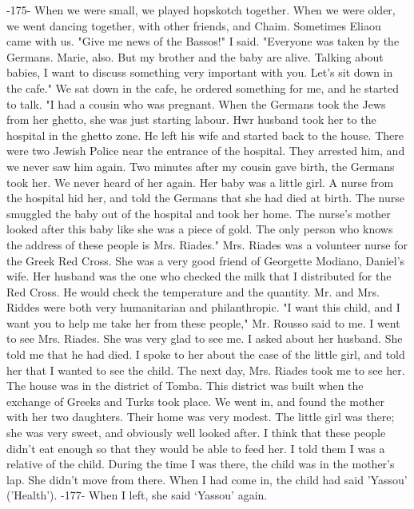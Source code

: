 
-175- 
When we were small, we played hopskotch together.
When we were older, 
we went dancing together, with other friends, and Chaim.
Sometimes 
Eliaou came with us.
"Give me news of the Bassos!"
I said.
"Everyone was taken by the Germans.
Marie, also.
But my brother 
and the baby are alive.
Talking about babies, I want to discuss something very important with you.
Let's sit down in the cafe."
We sat down in the cafe, he ordered something for me, and he started to 
talk.
"I had a cousin who was pregnant.
When the Germans took the 
Jews from her ghetto, she was just starting labour.
Hwr husband took 
her to the hospital in the ghetto zone.
He left his wife and started 
back to the house.
There were two Jewish Police near the entrance of 
the hospital.
They arrested him, and we never saw him again.
Two minutes after my cousin gave birth, the Germans took her.
We never heard 
of her again.
Her baby was a little girl.
A nurse from the hospital 
hid her, and told the Germans that she had died at birth.
The nurse 
smuggled the baby out of the hospital and took her home.
The nurse's 
mother looked after this baby like she was a piece of gold.
The only 
person who knows the address of these people is Mrs.
Riades."
Mrs.
Riades was a volunteer nurse for the Greek Red Cross.
She was 
a very good friend of Georgette Modiano, Daniel's wife.
Her husband was 
the one who checked the milk that I distributed for the Red Cross.
He 
would check the temperature and the quantity.
Mr.
and Mrs.
Riddes were 
both very humanitarian and philanthropic.
"I want this child, and I want you to help me take her from these 
people," Mr.
Rousso said to me.
I went to see Mrs.
Riades.
She was very glad to see me.
I asked 
about her husband.
She told me that he had died.
I spoke to her about 
the case of the little girl, and told her that I wanted to see the 
child.
The next day, Mrs.
Riades took me to see her.
The house was in the district of Tomba.
This district was built 
when the exchange of Greeks and Turks took place.
We went in, and found 
the mother with her two daughters.
Their home was very modest.
The 
little girl was there; she was very sweet, and obviously well looked after.
I think that these people didn't eat enough so that they would be 
able to feed her.
I told them I was a relative of the child.
During the time I was there, the child was in the mother's lap.
She didn't move
from there.
When I had come in, the child had said 'Yassou' ('Health').
-177- 
When I left, she said ‘Yassou’ again.
